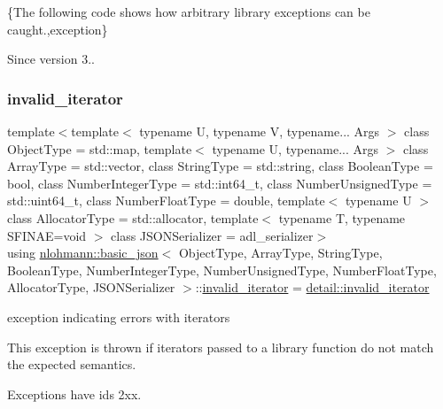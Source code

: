 \{The following code shows how arbitrary library exceptions can be caught.,exception\}

\begin{DoxySince}{Since}
version 3.. 
\end{DoxySince}
\mbox{\label{classnlohmann_1_1basic__json_ac13d32f7cbd02d616e71d8dc30dadcbf}} 
\subsubsection{\texorpdfstring{invalid\+\_\+iterator}{invalid\_iterator}}
{\footnotesize\ttfamily template$<$template$<$ typename U, typename V, typename... Args $>$ class Object\+Type = std\+::map, template$<$ typename U, typename... Args $>$ class Array\+Type = std\+::vector, class String\+Type  = std\+::string, class Boolean\+Type  = bool, class Number\+Integer\+Type  = std\+::int64\+\_\+t, class Number\+Unsigned\+Type  = std\+::uint64\+\_\+t, class Number\+Float\+Type  = double, template$<$ typename U $>$ class Allocator\+Type = std\+::allocator, template$<$ typename T, typename S\+F\+I\+N\+A\+E=void $>$ class J\+S\+O\+N\+Serializer = adl\+\_\+serializer$>$ \\
using \mbox{\hyperlink{classnlohmann_1_1basic__json}{nlohmann\+::basic\+\_\+json}}$<$ Object\+Type, Array\+Type, String\+Type, Boolean\+Type, Number\+Integer\+Type, Number\+Unsigned\+Type, Number\+Float\+Type, Allocator\+Type, J\+S\+O\+N\+Serializer $>$\+::\mbox{\hyperlink{classnlohmann_1_1basic__json_ac13d32f7cbd02d616e71d8dc30dadcbf}{invalid\+\_\+iterator}} =  \mbox{\hyperlink{classnlohmann_1_1detail_1_1invalid__iterator}{detail\+::invalid\+\_\+iterator}}}



exception indicating errors with iterators 

This exception is thrown if iterators passed to a library function do not match the expected semantics.

Exceptions have ids 2xx.

